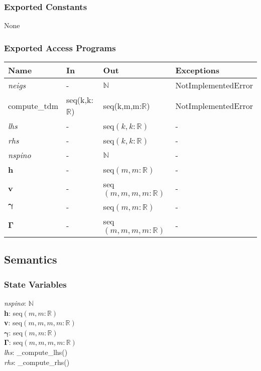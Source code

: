 \documentclass[12pt, titlepage]{article}
\begin{document}
\subsubsection{Exported Constants}
None

\subsubsection{Exported Access Programs}

\begin{center}
	\begin{tabular}{p{2.3cm} p{4cm} p{4cm} p{2cm}}
		\hline
		\textbf{Name} & \textbf{In} & \textbf{Out} & \textbf{Exceptions} \\
		\hline
		\textit{neigs} & -& $\mathbb{N}$& NotImplementedError\\
		compute\_tdm& seq(k,k:$\mathbb{R}$)& seq(k,m,m:$\mathbb{R}$)& 
		NotImplementedError\\
		\textit{lhs} & -& seq$(k,k:\mathbb{R})$& -\\
		\textit{rhs} & -& seq$(k,k:\mathbb{R})$& -\\
		\textit{nspino}& -& $\mathbb{N}$& -\\
		\textbf{h}& -& seq$(m,m:\mathbb{R})$& -\\
		\textbf{v}& -& seq$(m,m,m,m:\mathbb{R})$& -\\
		$\boldsymbol{\gamma}$& -& seq$(m,m:\mathbb{R})$& -\\
		$\boldsymbol{\Gamma}$& -& seq$(m,m,m,m:\mathbb{R})$& -\\
		\hline
	\end{tabular}
\end{center}

\subsection{Semantics}

\subsubsection{State Variables}
\textit{nspino}: $\mathbb{N}$\\
\textbf{h}: seq$(m,m:\mathbb{R})$\\
\textbf{v}: seq$(m,m,m,m:\mathbb{R})$\\
$\boldsymbol{\gamma}$: seq$(m,m:\mathbb{R})$\\
$\boldsymbol{\Gamma}$: seq$(m,m,m,m:\mathbb{R})$\\
\textit{lhs}: \_compute\_lhs()\\
\textit{rhs}: \_compute\_rhs()
\end{document}
